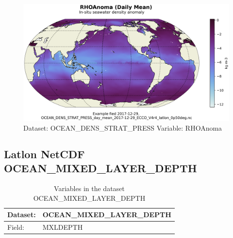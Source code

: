 \begin{figure}[H]
\centering
\includegraphics[scale=0.55]{../images/plots/latlon_plots/Ocean_Density_Stratification_and_Hydrostatic_Pressure/RHOAnoma.png}
\caption{Dataset: OCEAN\_DENS\_STRAT\_PRESS Variable: RHOAnoma}
\label{tab:table-OCEAN_DENS_STRAT_PRESS_RHOAnoma-Plot}
\end{figure}
\pagebreak
\subsection{Latlon NetCDF OCEAN\_MIXED\_LAYER\_DEPTH}
\newp
\begin{longtable}{|p{}|p{}|}
\caption{Variables in the dataset OCEAN\_MIXED\_LAYER\_DEPTH}
\label{tab:table-OCEAN_MIXED_LAYER_DEPTH-fields} \\ 
\hline \endhead \hline \endfoot
\rowcolor{lightgray} \textbf{Dataset:} & \textbf{OCEAN\_MIXED\_LAYER\_DEPTH} \\ \hline
Field: &MXLDEPTH \\ \hline
\end{longtable}

\pagebreak
